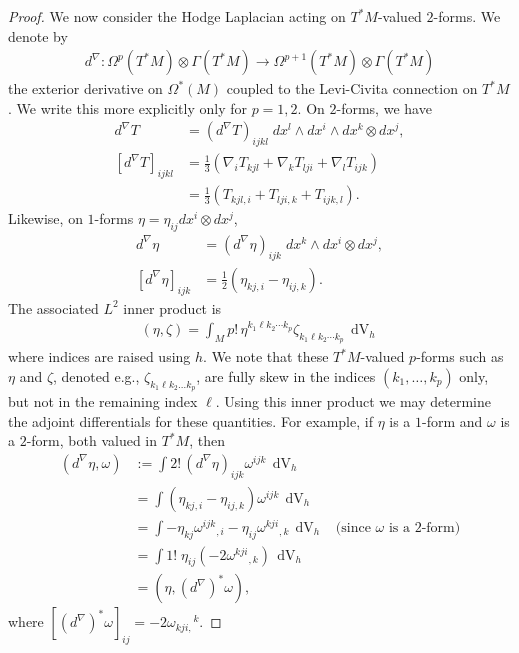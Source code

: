 \documentclass[10pt,reqno]{amsart}
\DeclareMathOperator{\dvol}{dV}
\begin{document}
\begin{proof}
We now consider the Hodge Laplacian acting on $T^*M$-valued $2$-forms.  We denote by 
\begin{align*}
d^\nabla: \Omega^p(T^*M) \otimes \Gamma(T^*M) \longrightarrow \Omega^{p+1}(T^*M) \otimes \Gamma(T^*M)
\end{align*}
the exterior derivative on $\Omega^*(M)$ coupled to the Levi-Civita connection on $T^* M$. We write this more explicitly only
for $p = 1, 2$.   On $2$-forms, we have
\begin{align*}
d^\nabla T &= (d^\nabla T)_{ijkl} \; dx^l \wedge dx^i \wedge dx^k \otimes dx^j, \nonumber \\
[d^\nabla T]_{ijkl} &= \frac{1}{3} ( \nabla_i T_{k j l} + \nabla_k T_{l j i} + \nabla_l T_{i j k} ) \nonumber \\ 
	&= \frac{1}{3} ( T_{kjl,i} + T_{lji,k} + T_{ijk,l} ).
\end{align*}
Likewise, on $1$-forms $\eta = \eta_{ij} dx^i \otimes dx^j$,  
\begin{align*}
d^\nabla \eta &= (d^\nabla \eta)_{ijk} \; dx^k \wedge dx^i \otimes dx^j, \nonumber \\
[d^\nabla \eta]_{ijk} &= \frac{1}{2} (\eta_{kj,i} - \eta_{ij,k}).
\end{align*} 
The associated $L^2$ inner product is 
\begin{align*}
(\eta, \zeta) = \int_{M} p! \, \eta^{k_1 \ell  k_2 \cdots k_p} \zeta_{k_1  \ell k_2 \cdots k_p} \, \dvol_h 
\end{align*}
where indices are raised using $h$.  We note that these $T^*M$-valued $p$-forms such as $\eta$ and $\zeta$, denoted e.g., $\zeta_{k_1 \ell k_2 \ldots k_p}$, are fully skew in the indices $(k_1, \ldots, k_p)$ only,
but not in the remaining index $\ell$. 
Using this inner product we may determine the adjoint differentials for these quantities. For example, if $\eta$ is a $1$-form and $\omega$ is a $2$-form,
both valued in $T^*M$, then 
\begin{align*}
(d^\nabla \eta, \omega) &:= \int 2! \, (d^\nabla \eta)_{ijk} \omega^{ijk} \, \dvol_h\\
&= \int (\eta_{kj,i} - \eta_{ij,k}) \omega^{ijk} \, \dvol_h\\
&= \int -\eta_{kj} {\omega^{ijk}}_{,i} - \eta_{ij} {\omega^{kji}}_{,k} \, \dvol_h \; \; \; \mbox{(since $\omega$ is a 2-form)} \\
&= \int 1! \; \eta_{ij} ( - 2 {\omega^{kji}}_{,k} ) \, \dvol_h\\
&= (\eta, (d^\nabla)^* \omega ),
\end{align*}
where $[(d^\nabla)^* \omega]_{ij} = - 2 {\omega_{kji,}}^k$.
	

\end{proof}
\end{document}
